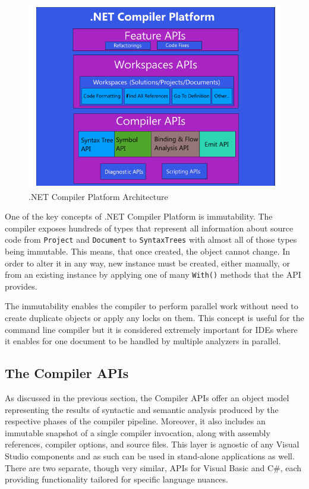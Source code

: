 \documentclass[
  digital, %
  table,   %
  lof,     %
  lot,     %
  oneside,
]{fithesis3}
\begin{document}
\begin{figure}[h!]
		\centering
			\includegraphics[scale=0.6]{img/roslyn-compiler-architecture}
		\caption{.NET Compiler Platform Architecture~\cite{roslyn-succincly}}
		\label{fig:roslyn-compiler-architecture}
\end{figure}

One of the key concepts of .NET Compiler Platform is immutability. The compiler exposes hundreds of types that represent all information about source code from \texttt{Project} and \texttt{Document} to \texttt{SyntaxTrees} with almost all of those types being immutable. This means, that once created, the object cannot change. In order to alter it in any way, new instance must be created, either manually, or from an existing instance by applying one of many \texttt{With()} methods that the API provides.

The immutability enables the compiler to perform parallel work without need to create duplicate objects or apply any locks on them. This concept is useful for the command line compiler but it is considered extremely important for IDEs where it enables for one document to be handled by multiple analyzers in parallel.

\subsection{The Compiler APIs}
As discussed in the previous section, the Compiler APIs offer an object model representing the results of syntactic and semantic analysis produced by the respective phases of the compiler pipeline. Moreover, it also includes an immutable snapshot of a single compiler invocation, along with assembly references, compiler options, and source files. This layer is agnostic of any Visual Studio components and as such can be used in stand-alone applications as well. There are two separate, though very similar, APIs for Visual Basic and C\#, each providing functionality tailored for specific language nuances.
\end{document}

